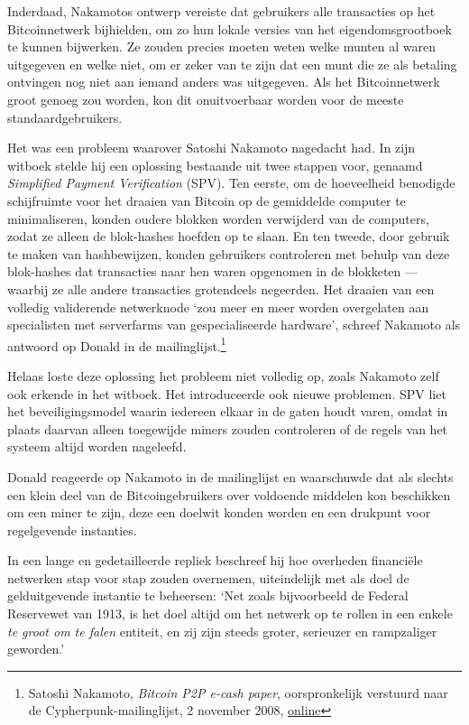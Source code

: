 \documentclass[
  a5paper,
  smalldemyvopaper,11pt,twoside,onecolumn,openright,extrafontsizes,
hidelinks]{memoir}
\begin{document}
Inderdaad, Nakamotos ontwerp vereiste dat gebruikers alle transacties op
het Bitcoinnetwerk bijhielden, om zo hun lokale versies van het
eigendomsgrootboek te kunnen bijwerken. Ze zouden precies moeten weten
welke munten al waren uitgegeven en welke niet, om er zeker van te zijn
dat een munt die ze als betaling ontvingen nog niet aan iemand anders
was uitgegeven. Als het Bitcoinnetwerk groot genoeg zou worden, kon dit
onuitvoerbaar worden voor de meeste standaardgebruikers.

Het was een probleem waarover Satoshi Nakamoto nagedacht had. In zijn
witboek stelde hij een oplossing bestaande uit twee stappen voor,
genaamd \emph{Simplified Payment Verification} (SPV). Ten eerste, om de
hoeveelheid benodigde schijfruimte voor het draaien van Bitcoin op de
gemiddelde computer te minimaliseren, konden oudere blokken worden
verwijderd van de computers, zodat ze alleen de blok-hashes hoefden op
te slaan. En ten tweede, door gebruik te maken van hashbewijzen, konden
gebruikers controleren met behulp van deze blok-hashes dat transacties
naar hen waren opgenomen in de blokketen --- waarbij ze alle andere
transacties grotendeels negeerden. Het draaien van een volledig
validerende netwerknode `zou meer en meer worden overgelaten aan
specialisten met serverfarms van gespecialiseerde hardware', schreef
Nakamoto als antwoord op Donald in de mailinglijst.\footnote{Satoshi
  Nakamoto, \emph{Bitcoin P2P e-cash paper}, oorspronkelijk verstuurd
  naar de Cypherpunk-mailinglijst, 2 november 2008,
  \href{https://www.metzdowd.com/pipermail/cryptography/2008-November/014815.html}{online}}

Helaas loste deze oplossing het probleem niet volledig op, zoals
Nakamoto zelf ook erkende in het witboek. Het introduceerde ook nieuwe
problemen. SPV liet het beveiligingsmodel waarin iedereen elkaar in de
gaten houdt varen, omdat in plaats daarvan alleen toegewijde miners
zouden controleren of de regels van het systeem altijd worden nageleefd.

Donald reageerde op Nakamoto in de mailinglijst en waarschuwde dat als
slechts een klein deel van de Bitcoingebruikers over voldoende middelen
kon beschikken om een miner te zijn, deze een doelwit konden worden en
een drukpunt voor regelgevende instanties.

In een lange en gedetailleerde repliek beschreef hij hoe overheden
financiële netwerken stap voor stap zouden overnemen, uiteindelijk met
als doel de gelduitgevende instantie te beheersen: `Net zoals
bijvoorbeeld de Federal Reservewet van 1913, is het doel altijd om het
netwerk op te rollen in een enkele \emph{te groot om te falen} entiteit,
en zij zijn steeds groter, serieuzer en rampzaliger geworden.'
\end{document}
